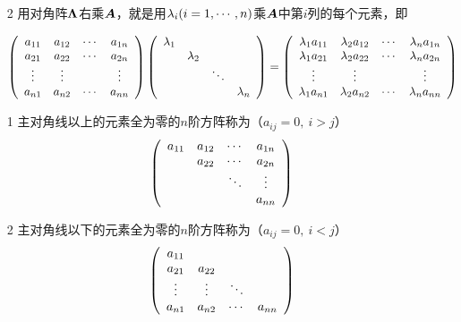 \begin{frame}
\begin{zhu*}
\begin{itemize}
  \item[2] 用对角阵$\boldsymbol{\Lambda}$右乘$\boldsymbol{A}$，就是用$\lambda_i(i=1,\cdots,n)$乘$\boldsymbol{A}$中第$i$列的每个元素，即
    \begin{footnotesize}
    $$
    \left(
      \begin{array}{cccc}
        a_{11} & a_{12} & \cdots & a_{1n}\\
        a_{21} & a_{22} & \cdots & a_{2n}\\
        \vdots & \vdots &  & \vdots\\
        a_{n1} & a_{n2} & \cdots & a_{nn}
      \end{array}
    \right)  
    \left(
      \begin{array}{cccc}
        \lambda_1 & & &\\
                  & \lambda_2 & & \\
                  & & \ddots & \\
                  & & & \lambda_n
      \end{array}
    \right)
    = 
    \left(
      \begin{array}{cccc}
        \lambda_1a_{11} & \lambda_2a_{12} & \cdots & \lambda_na_{1n}\\
        \lambda_1a_{21} & \lambda_2a_{22} & \cdots & \lambda_na_{2n}\\
        \vdots & \vdots &  & \vdots\\
        \lambda_1a_{n1} & \lambda_2a_{n2} & \cdots & \lambda_na_{nn}
      \end{array}
    \right)
    $$
    \end{footnotesize}
  \end{itemize}
\end{zhu*}

\end{frame}

\begin{frame}
\begin{dingyi}[三角矩阵]
  \begin{itemize}
  \item[1] 主对角线以上的元素全为零的$n$阶方阵称为（$a_{ij}=0, ~i>j$）
    $$
    \left(
      \begin{array}{cccc}
        a_{11} & a_{12} & \cdots & a_{1n} \\
               & a_{22} & \cdots & a_{2n} \\
               &       & \ddots & \vdots   \\
               &       &     & a_{nn}
      \end{array}
    \right)
    $$
  \item[2] 主对角线以下的元素全为零的$n$阶方阵称为（$a_{ij}=0, ~i<j$）
    $$
    \left(
      \begin{array}{cccc}
        a_{11} &       &     &       \\
        a_{21} & a_{22} &     &  \\
        \vdots   & \vdots   & \ddots &    \\
        a_{n1} & a_{n2} & \cdots & a_{nn}
      \end{array}
    \right)
    $$
  \end{itemize}
\end{dingyi}
\end{frame}

